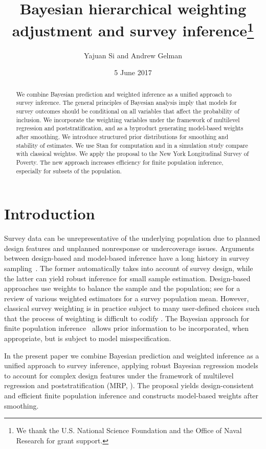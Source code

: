 \documentclass[11pt]{article}
\title{\bf Bayesian hierarchical weighting adjustment and survey inference\footnote{We thank the U.S. National Science Foundation and the Office of Naval Research for grant support.}\vspace{.1in}}
\author{Yajuan Si and Andrew Gelman\vspace{.1in}}
\date{5 June 2017}
\begin{document}
\maketitle


\begin{abstract}
We combine Bayesian prediction and weighted inference as a unified approach to survey inference. The general principles of Bayesian analysis imply that models for survey outcomes should be conditional on all variables that affect the probability of inclusion. We incorporate the weighting variables under the framework of multilevel regression and poststratification, and as a byproduct generating model-based weights after smoothing.  We introduce structured prior distributions for smoothing and stability of estimates. We use Stan for computation and in a simulation study compare with classical weightss. We apply the proposal to the New York Longitudinal Survey of Poverty. The new approach increases efficiency for finite population inference, especially for subsets of the population.
\end{abstract}
\section{Introduction}

Survey data can be unrepresentative of the underlying population due to planned design features and unplanned nonresponse or undercoverage issues. Arguments between design-based and model-based inference have a long history in survey sampling~\citep{little04-model}. The former automatically takes into account of survey design, while the latter can yield robust inference for small sample estimation. Design-based approaches use weights to balance the sample and the population; see \cite{samsi:review17} for a review of various weighted estimators for a survey population mean. However, classical survey weighting is in practice subject to many user-defined choices such that the process of weighting is difficult to codify \citep{gelman07}. The Bayesian approach for finite population inference~\citep{ghosh:meeden:97} allows prior information to be incorporated, when appropriate, but is subject to model misspecification.

In the present paper we combine Bayesian prediction and weighted inference as a unified approach to survey inference, applying robust Bayesian regression models to account for complex design features under the framework of multilevel regression and poststratification (MRP, \cite{gelman:little:97,park:gelman:bafumi-04,Ghitza:gelman-13}). The proposal yields design-consistent and efficient finite population inference and constructs model-based weights after smoothing.
\end{document}
